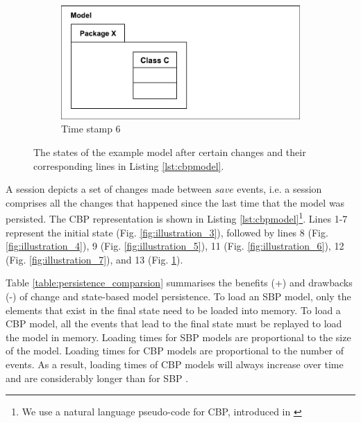 \begin{figure}[ht]
    \begin{subfigure}[t]{0.329\linewidth}
        \centering
        \includegraphics[width=\linewidth]{images/illustration_8}
        \caption{Time stamp 6}
        \label{fig:illustration_8}
    \end{subfigure}
    
    \caption{The states of the example model after certain changes and their corresponding lines in Listing \ref{lst:cbpmodel}.}
    \label{fig:illustration_cbp}
\end{figure}

A session depicts a set of changes made between $save$ events, i.e. a session comprises all the changes that happened since the last time that the model was persisted. The CBP representation is shown in Listing \ref{lst:cbpmodel}\footnote{We use a natural language pseudo-code for CBP, introduced in \cite{DBLP:conf/models/YohannisKP17,yohannis2018towards}}. Lines 1-7 represent the initial state (Fig. \ref{fig:illustration_3}), followed by lines 8 (Fig. \ref{fig:illustration_4}), 9 (Fig. \ref{fig:illustration_5}), 11 (Fig. \ref{fig:illustration_6}), 12 (Fig. \ref{fig:illustration_7}), and 13 (Fig. \ref{fig:illustration_8}). 

Table \ref{table:persistence_comparsion} summarises the benefits (+) and drawbacks (-) of change and state-based model persistence. To load an SBP model, only the elements that exist in the final state need to be loaded into memory. To load a CBP model, all the events that lead to the final state must be replayed to load the model in memory. Loading times for SBP models are proportional to the size of the model. Loading times for CBP models are proportional to the number of events. As a result, loading times of CBP models will always increase over time and are considerably longer than for SBP \cite{yohannis2018towards,mens2002state}. 

